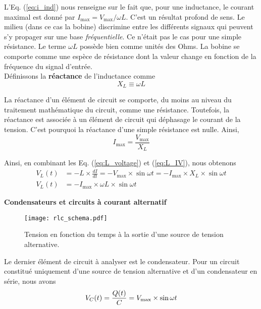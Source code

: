 \documentclass[titlepage,oneside,a4paper,11pt]{book} %
\begin{document}
L'Eq. (\ref{eq:i_ind}) nous renseigne sur le fait que, pour une inductance, le courant maximal est donné par $I_{\mathrm{max}}=V_{\mathrm{max}}/\omega L$. C'est un résultat profond de sens.  Le milieu (dans ce cas la bobine) discrimine entre les différents signaux qui peuvent s'y propager sur une base \emph{fréquentielle}.  Ce n'était pas le cas pour une simple résistance. Le terme $\omega L$ possède bien comme unités des Ohms. La bobine se comporte comme une espèce de résistance dont la valeur change en fonction de la fréquence du signal d'entrée.\\

Définissons la \textbf{réactance} de l'inductance comme
\begin{equation}
    X_L \equiv \omega L
    \label{eq:reac_L}
\end{equation}

La réactance d'un élément de circuit se comporte, du moins au niveau du traitement mathématique du circuit, comme une résistance. Toutefois, la réactance est associée à un élément de circuit qui déphasage le courant de la tension.  C'est pourquoi la réactance d'une simple résistance est nulle. Ainsi,
\begin{equation}
    I_{\mathrm{max}} = \frac{V_{\mathrm{max}}}{X_L}
    \label{eq:L_IV}
\end{equation}

Ainsi, en combinant les Eq. (\ref{eq:L_voltage}) et (\ref{eq:L_IV}), nous obtenons
\begin{align}
    V_L(t) &= -L\times\frac{dI}{dt} = -V_{\mathrm{max}}\times\sin \omega t = -I_{\mathrm{max}}\times X_L\times\sin \omega t \nonumber\\
    V_L(t) &= -I_{\mathrm{max}}\times \omega L\times\sin \omega t 
\end{align}

{\Large \textbf{Condensateurs et circuits à courant alternatif}}\\
\begin{wrapfigure}{r}{0.4\textwidth}
  \begin{center}
    \texttt{[image: rlc\_schema.pdf]}
    \caption{Tension en fonction du temps à la sortie d'une source de tension alternative.}
    \label{fig:rlc_schema}
  \end{center}
\end{wrapfigure}
Le dernier élément de circuit à analyser est le condensateur.  Pour un circuit constitué uniquement d'une source de tension alternative et d'un condensateur en série, nous avons
\begin{equation}
    V_C(t) =\frac{Q(t)}{C}= V_{\mathrm{max}}\times \sin \omega t\\
    \label{eq:c_voltage}
\end{equation}
\end{document}
